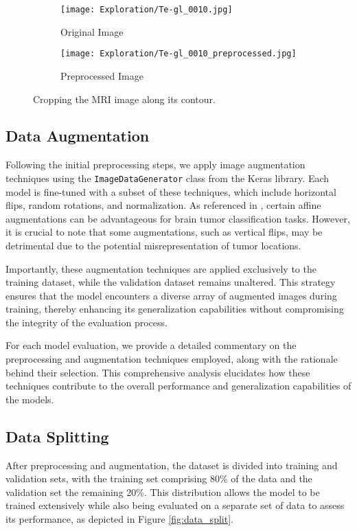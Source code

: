 \begin{figure}[H]
  \centering
  \begin{subfigure}[b]{0.3\textwidth}
    \centering
    \texttt{[image: Exploration/Te-gl\_0010.jpg]}
    \caption{Original Image}
    \label{fig:original_image}
  \end{subfigure}
  \begin{subfigure}[b]{0.3\textwidth}
    \centering
    \texttt{[image: Exploration/Te-gl\_0010\_preprocessed.jpg]}
    \caption{Preprocessed Image}
    \label{fig:preprocessed_image}
  \end{subfigure}
  \caption{Cropping the MRI image along its contour.}\label{fig:image_cropping}
\end{figure}


\subsection{Data Augmentation}\label{data_augmentation}

Following the initial preprocessing steps, we apply image augmentation techniques using the \texttt{ImageDataGenerator} class from the Keras library. Each model is fine-tuned with a subset of these techniques, which include horizontal flips, random rotations, and normalization. As referenced in \cite{nalepa_data_2019}, certain affine augmentations can be advantageous for brain tumor classification tasks. However, it is crucial to note that some augmentations, such as vertical flips, may be detrimental due to the potential misrepresentation of tumor locations.

Importantly, these augmentation techniques are applied exclusively to the training dataset, while the validation dataset remains unaltered. This strategy ensures that the model encounters a diverse array of augmented images during training, thereby enhancing its generalization capabilities without compromising the integrity of the evaluation process.

For each model evaluation, we provide a detailed commentary on the preprocessing and augmentation techniques employed, along with the rationale behind their selection. This comprehensive analysis elucidates how these techniques contribute to the overall performance and generalization capabilities of the models.

\subsection{Data Splitting}\label{data_splitting}
After preprocessing and augmentation, the dataset is divided into training and validation sets, with the training set comprising 80\% of the data and the validation set the remaining 20\%. This distribution allows the model to be trained extensively while also being evaluated on a separate set of data to assess its performance, as depicted in Figure \ref{fig:data_split}.

